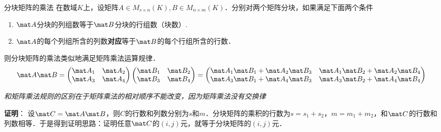 \begin{theorem}{分块矩阵的乘法}
在数域$K$上，设矩阵$A\in{M_{s\times{n}}(K)},B\in{M_{n\times{m}}(K)}$．分别对两个矩阵分块，如果满足下面两个条件
\begin{enumerate}
\item $\mat A$分块的列组数等于$\mat B$分块的行组数（块数）.
\item $\mat A$的每个列组所含的列数\textbf{对应}等于$\mat B$的每个行组所含的行数．
\end{enumerate}
则分块矩阵的乘法类似地满足矩阵乘法运算规律．
\begin{equation}
\mat A\mat B=
\begin{pmatrix}
\mat A_1 & \mat A_2\\
\mat A_3 & \mat A_4
\end{pmatrix}
\begin{pmatrix}
\mat B_1 & \mat B_2\\
\mat B_3 & \mat B_4
\end{pmatrix}
=
\begin{pmatrix}
\mat A_1\mat B_1+\mat A_2\mat B_3 & \mat A_1\mat B_2+\mat A_2\mat B_4\\
\mat A_3\mat B_1+\mat A_4\mat B_3 & \mat A_3\mat B_2+\mat A_4\mat B_4
\end{pmatrix}
\end{equation}
\end{theorem}
\textsl{和矩阵乘法规则的区别在于矩阵乘法的相对顺序不能改变，因为矩阵乘法没有交换律}

\textbf{证明}：
设$\mat C=\mat A\mat B$，则$C$的行数和列数分别为$s$和$m$．分块矩阵的乘积的行数为$s=s_1+s_2$，$m=m_1+m_2$，和$\mat C$的行数和列数相等．于是得到证明思路：证明任意$\mat C$的$(i,j)$元，就等于分块矩阵的$(i,j)$元．


